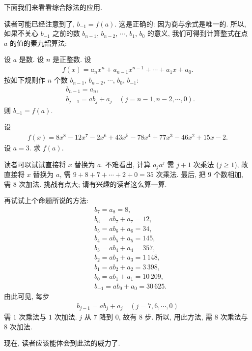 \myLine

下面我们来看看综合除法的应用.

读者可能已经注意到了, $b_{-1} = f(a)$. 这是正确的: 因为商与余式是唯一的. 所以, 如果不关心 $b_{-1}$ 之前的数 $b_{n-1}$, $b_{n-2}$, $\cdots$, $b_1$, $b_0$ 的意义, 我们可得到计算整式在点 $a$ 的值的秦九韶算法:
\begin{proposition}
    设 $a$ 是数. 设 $n$ 是正整数. 设
    \begin{align*}
        f(x) = a_n x^n + a_{n-1} x^{n-1} + \cdots + a_1 x + a_0.
    \end{align*}
    按如下规则作 $n$ 个数 $b_{n-1}$, $b_{n-2}$, $\cdots$, $b_0$, $b_{-1}$:
    \begin{align*}
         & b_{n-1} = a_n,                                     \\
         & b_{j-1} = ab_j + a_j \quad (j = n-1,n-2,\cdots,0).
    \end{align*}
    则 $b_{-1} = f(a)$.
\end{proposition}

\begin{example}
    设
    \begin{align*}
        f(x) = 8 x^8 - 12 x^7 - 2 x^6 + 43 x^5 - 78 x^4 + 77 x^3 - 46 x^2 + 15 x - 2.
    \end{align*}
    设 $a = 3$. 求 $f(a)$.

    读者可以试试直接将 $x$ 替换为 $a$. 不难看出, 计算 $a_j a^j$ 需 $j + 1$ 次乘法 ($j \geq 1$), 故直接将 $x$ 替换为 $a$, 需 $9 + 8 + 7 + \cdots + 2 + 0 = 35$ 次乘法. 最后, 把 $9$ 个数相加, 需 $8$ 次加法. 挑战有点大; 请有兴趣的读者这么算一算.

    再试试上个命题所说的方法:
    \begin{align*}
         & b_7 = a_8 = 8,                 \\
         & b_6 = ab_7 + a_7 = 12,         \\
         & b_5 = ab_6 + a_6 = 34,         \\
         & b_4 = ab_5 + a_5 = 145,        \\
         & b_3 = ab_4 + a_4 = 357,        \\
         & b_2 = ab_3 + a_3 = 1\,148,     \\
         & b_1 = ab_2 + a_2 = 3\,398,     \\
         & b_0 = ab_1 + a_1 = 10\,209,    \\
         & b_{-1} = ab_0 + a_0 = 30\,625.
    \end{align*}
    由此可见, 每步
    \begin{align*}
        b_{j-1} = ab_j + a_j \quad (j = 7, 6, \cdots, 0)
    \end{align*}
    需 $1$ 次乘法与 $1$ 次加法. $j$ 从 $7$ 降到 $0$, 故有 $8$ 步. 所以, 用此方法, 需 $8$ 次乘法与 $8$ 次加法.

    现在, 读者应该能体会到此法的威力了.
\end{example}

